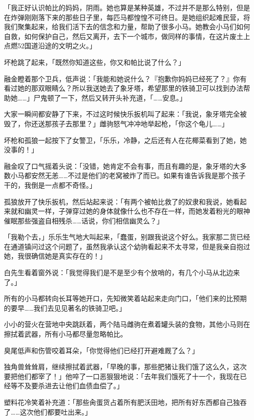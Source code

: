 「我正好认识帕比的妈妈，阴雨。她也算是某种英雄，不过并不是那么特别，但是在炸弹刚刚落下来的那些日子里，每匹马都惶惶不可终日。是她组织起难民营，将我们聚集起来，给我们活下去的信念和力量，帮助了很多小马。她教会小马们如何自救，如何保护自己，然后又离开，去下一个城市，做同样的事情，在这片废土上点燃52国道沿途的文明之火。」

坏枪跳了起来，「既然你知道这些，你又和帕比说了什么？」

融金瞪着那个卫兵，低声说：「我能和她说什么？『抱歉你妈妈已经死了？』你有看过她的那双眼睛么？所以我送她去了象牙塔，希望那里的铁骑卫可以找到办法帮助她……」尸鬼顿了一下，然后又转开头补充道，「……安息。」

大家一瞬间都安静了下来，不过这时候快乐扳机叫了起来：「我说，象牙塔完全被毁了，你还送那孩子去那里？」雌驹怒气冲冲地举起枪，「你这个龟儿……」

坏枪和孤狼一起按下了女警卫，「乐乐，冷静，之后还有人在花椰菜看到了她，她没事的！」

融金叹了口气摇着头说：「没错，她肯定不会有事，而且有趣的是，象牙塔的大多数小马都安然无恙……不过是他们的老窝被炸了而已。如果有谁告诉我是那个孩子干的，我倒是一点都不奇怪。」

孤狼放开了快乐扳机，然后站起来说：「有两个被帕比救了的奴隶和我说，她看起来就和幽灵一样，子弹穿过她的身体就像什么也不存在一样，而她发着粉光的眼神催眠那些强盗自相残杀……话说，你们相信幽灵么？」

「我勒个去，」乐乐生气地大叫起来，「蠢蛋，别跟我说这个好么。我家那二货已经在通道镇问过这个问题了，虽然我承认这个幼驹看起来不太寻常，但是我亲自抱过她，我很确信她是真实存在的！」

白先生看着窗外说：「我觉得我们是不是至少有个放哨的，有几个小马从北边来了。」

所有的小马都转向长耳等她开口，先知微笑着站起来走向门口，「他们来的比预期的要早……我们去见见著名的铁骑卫吧。」

\horizonline


小小的营火在营地中央跳跃着，两个陆马雌驹在煮着罐头装的食物，其他小马则在擦拭着武器，所有小马都尽量忽略帕比。

臭尾低声和伤管咬着耳朵，「你觉得他们已经打开避难厩了么？」

独角兽耸耸肩，继续擦拭着武器，「早晚的事，那些肥猪让我们饿了这么久，这次要把他们都宰了！」他啐了一口恶狠狠地说：「去年我们饿死了十一个，我现在已经等不及要杀进去让他们血债血偿了。」

塑料花冷笑着补充道：「那些肏蛋货占着所有肥沃田地，把所有好东西都自己独吞了……这次他们都要吐出来。」

